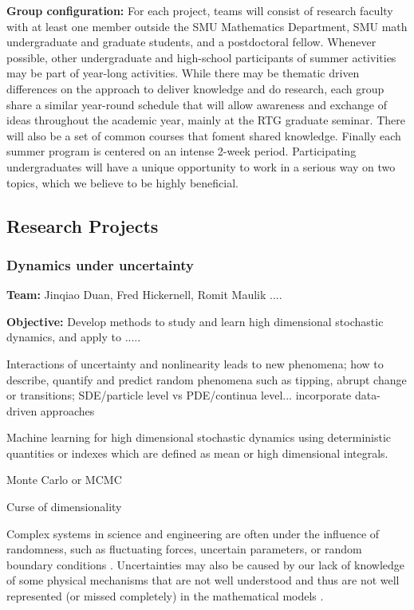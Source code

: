 \documentclass[11pt]{article}
\begin{document}
{\bf Group configuration:} For each project, teams will consist of research faculty with at least one member
outside the SMU Mathematics Department, SMU math undergraduate and graduate students, and a postdoctoral
fellow. Whenever possible, other undergraduate and high-school participants of summer activities
may be part of year-long activities. While there may be thematic driven differences on the approach to deliver
knowledge and do research, each group share a similar year-round schedule that will allow awareness
and exchange of ideas throughout the academic year, mainly at the RTG graduate seminar. There will also
be a set of common courses that foment shared knowledge. Finally each summer program is centered on
an intense 2-week period. Participating undergraduates will have a unique opportunity to work in a serious
way on two topics, which we believe to be highly beneficial.


\subsection{Research Projects}


\subsubsection{Dynamics  under uncertainty} 

{\bf Team:} Jinqiao Duan, Fred Hickernell, Romit Maulik ....

{\bf Objective:} Develop methods to study and learn high dimensional stochastic dynamics, and apply to .....

Interactions of uncertainty and nonlinearity leads to new phenomena; how to describe, quantify and predict random phenomena such as tipping, abrupt change or transitions; SDE/particle level vs PDE/continua level... incorporate data-driven approaches

Machine learning for high dimensional stochastic dynamics using deterministic quantities or indexes 
which are defined as mean or high dimensional integrals.

Monte Carlo or MCMC

Curse of dimensionality 



  Complex systems in science and engineering
  are often under the influence  of randomness, such as fluctuating forces, uncertain parameters, or random boundary conditions \cite{Moss, Horst, Gar, VanKampen3, WaymireDuan, Wong}.  Uncertainties may also be caused by our lack of knowledge of some
  physical mechanisms  that are   not     well understood  and thus are not well
represented (or missed completely) in the mathematical models
\cite{Palmer1, ChenDuan, Kantz, Wilks, Williams}.
\end{document}
